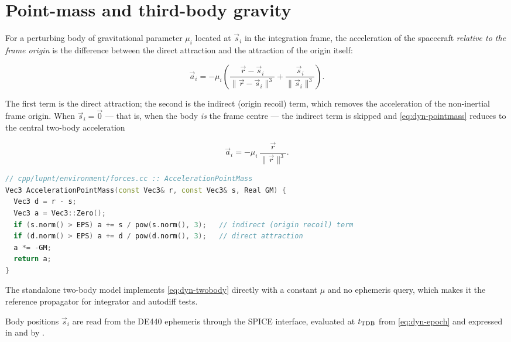 \section{Point-mass and third-body gravity}
\label{sec:dyn-pointmass}

For a perturbing body of gravitational parameter $\mu_i$ located at $\vec{s}_i$ in
the integration frame, the acceleration of the spacecraft \emph{relative to the
frame origin} is the difference between the direct attraction and the attraction
of the origin itself:

\begin{equation}
  \label{eq:dyn-pointmass}
  \vec{a}_i = -\mu_i\left(
    \frac{\vec{r}-\vec{s}_i}{\lVert\vec{r}-\vec{s}_i\rVert^{3}}
    + \frac{\vec{s}_i}{\lVert\vec{s}_i\rVert^{3}}
  \right).
\end{equation}

The first term is the direct attraction; the second is the indirect (origin
recoil) term, which removes the acceleration of the non-inertial frame origin.
When $\vec{s}_i=\vec{0}$ --- that is, when the body \emph{is} the frame centre ---
the indirect term is skipped and \cref{eq:dyn-pointmass} reduces to the central
two-body acceleration

\begin{equation}
  \label{eq:dyn-twobody}
  \vec{a}_i = -\mu_i\,\frac{\vec{r}}{\lVert\vec{r}\rVert^{3}} .
\end{equation}

\begin{lstlisting}[language=cpp, caption={Point-mass acceleration with the indirect term.}, label={lst:dyn-pointmass}]
// cpp/lupnt/environment/forces.cc :: AccelerationPointMass
Vec3 AccelerationPointMass(const Vec3& r, const Vec3& s, Real GM) {
  Vec3 d = r - s;
  Vec3 a = Vec3::Zero();
  if (s.norm() > EPS) a += s / pow(s.norm(), 3);   // indirect (origin recoil) term
  if (d.norm() > EPS) a += d / pow(d.norm(), 3);   // direct attraction
  a *= -GM;
  return a;
}
\end{lstlisting}

The standalone two-body model  implements
\cref{eq:dyn-twobody} directly with a constant $\mu$ and no ephemeris query,
which makes it the reference propagator for integrator and autodiff tests.

Body positions $\vec{s}_i$ are read from the DE440 ephemeris
\citep{park2021de440} through the SPICE interface, evaluated at $t_{\mathrm{TDB}}$ from
\cref{eq:dyn-epoch} and expressed in  and  by
.

